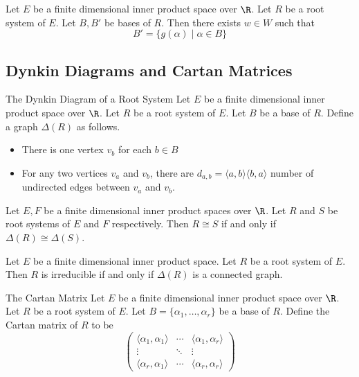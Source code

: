\documentclass[a4paper]{article}
\begin{document}
\begin{prp}{}{} Let $E$ be a finite dimensional inner product space over $\R$. Let $R$ be a root system of $E$. Let $B,B'$ be bases of $R$. Then there exists $w\in W$ such that $$B'=\{g(\alpha)\;|\;\alpha\in B\}$$
\end{prp}

\subsection{Dynkin Diagrams and Cartan Matrices}
\begin{defn}{The Dynkin Diagram of a Root System}{} Let $E$ be a finite dimensional inner product space over $\R$. Let $R$ be a root system of $E$. Let $B$ be a base of $R$. Define a graph $\Delta(R)$ as follows. 
\begin{itemize}
\item There is one vertex $v_b$ for each $b\in B$
\item For any two vertices $v_a$ and $v_b$, there are $d_{a,b}=\langle a,b\rangle\langle b,a\rangle$ number of undirected edges between $v_a$ and $v_b$. 
\end{itemize}
\end{defn}

\begin{prp}{}{} Let $E,F$ be a finite dimensional inner product spaces over $\R$. Let $R$ and $S$ be root systems of $E$ and $F$ respectively. Then $R\cong S$ if and only if $\Delta(R)\cong\Delta(S)$. 
\end{prp}

\begin{prp}{}{} Let $E$ be a finite dimensional inner product space. Let $R$ be a root system of $E$. Then $R$ is irreducible if and only if $\Delta(R)$ is a connected graph. 
\end{prp}

\begin{defn}{The Cartan Matrix}{} Let $E$ be a finite dimensional inner product space over $\R$. Let $R$ be a root system of $E$. Let $B=\{\alpha_1,\dots,\alpha_r\}$ be a base of $R$. Define the Cartan matrix of $R$ to be $$\begin{pmatrix}
\langle\alpha_1,\alpha_1\rangle & \cdots & \langle\alpha_1,\alpha_r\rangle\\
\vdots & \ddots & \vdots\\
\langle\alpha_r,\alpha_1\rangle & \cdots & \langle\alpha_r,\alpha_r\rangle
\end{pmatrix}$$
\end{defn}
\end{document}
